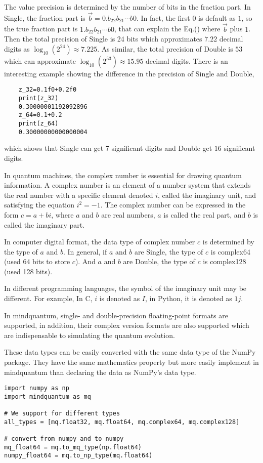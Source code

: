 The value precision is determined by the number of bits in the fraction part.
In Single, the fraction part is $\vec{b}=0.b_{22}b_{21}\cdots b{0}$.
In fact, the first $0$ is default as $1$, so the true fraction part is $1.b_{22}b_{21}\cdots b{0}$, that can explain the Eq.() where $\vec{b}$ plus $1$.
Then the total precision of Single is 24 bits which approximates $7.22$ decimal digits as $\log_{10}(2^{24}) \approx 7.225$.
As similar, the total precision of Double is $53$ which can approximate $\log_{10}(2^{53}) \approx 15.95$ decimal digits.
There is an interesting example showing the difference in the precision of Single and Double,
\begin{lstlisting}
    z_32=0.1f0+0.2f0
    print(z_32)
    0.30000001192092896
    z_64=0.1+0.2
    print(z_64)
    0.30000000000000004
\end{lstlisting}
which shows that Single can get $7$ significant digits and Double get $16$ significant digits.


In quantum machines, the complex number is essential for drawing quantum information. A complex number is an element of a number system that extends the real number with a specific element denoted $i$, called the imaginary unit, and satisfying the equation $i^2=-1$.
The complex number can be expressed in the form $c=a+bi$, where $a$ and $b$ are real numbers, $a$ is called the real part, and $b$ is called the imaginary part.

In computer digital format, the data type of complex number $c$ is determined by the type of $a$ and $b$.
In general, if $a$ and $b$ are Single, the type of $c$ is complex64 (used 64 bits to store $c$). And $a$ and $b$ are Double, the type of $c$ is complex128 (used 128 bits).

In different programming languages, the symbol of the imaginary unit may be different.
For example, In C, $i$ is denoted as $I$, in Python, it is denoted as $1j$. 

In mindquantum, single- and double-precision floating-point formats are supported, in addition, their complex version formats are also supported which are indispensable to simulating the quantum evolution.

These data types can be easily converted with the same data type of the NumPy package. They have the same mathematics property but more easily implement in mindquantum than declaring the data as NumPy's data type.
\begin{lstlisting}
import numpy as np
import mindquantum as mq

# We support for different types
all_types = [mq.float32, mq.float64, mq.complex64, mq.complex128]

# convert from numpy and to numpy
mq_float64 = mq.to_mq_type(np.float64)
numpy_float64 = mq.to_np_type(mq.float64)
\end{lstlisting}

